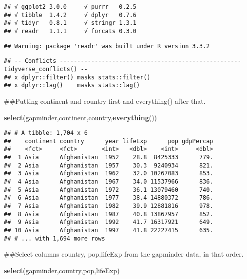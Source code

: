 \documentclass[]{article}
\newenvironment{Shaded}{\begin{snugshade}}{\end{snugshade}}
\newcommand{\KeywordTok}[1]{\textcolor[rgb]{0.13,0.29,0.53}{\textbf{#1}}}
\newcommand{\NormalTok}[1]{#1}
\begin{document}
\begin{verbatim}
## √ ggplot2 3.0.0     √ purrr   0.2.5
## √ tibble  1.4.2     √ dplyr   0.7.6
## √ tidyr   0.8.1     √ stringr 1.3.1
## √ readr   1.1.1     √ forcats 0.3.0
\end{verbatim}

\begin{verbatim}
## Warning: package 'readr' was built under R version 3.3.2
\end{verbatim}

\begin{verbatim}
## -- Conflicts ---------------------------------------------------- tidyverse_conflicts() --
## x dplyr::filter() masks stats::filter()
## x dplyr::lag()    masks stats::lag()
\end{verbatim}

\begin{Shaded}
\begin{Highlighting}[]
\NormalTok{##Putting continent and country first and everything() after that.}

\KeywordTok{select}\NormalTok{(gapminder,continent,country,}\KeywordTok{everything}\NormalTok{())}
\end{Highlighting}
\end{Shaded}

\begin{verbatim}
## # A tibble: 1,704 x 6
##    continent country      year lifeExp      pop gdpPercap
##    <fct>     <fct>       <int>   <dbl>    <int>     <dbl>
##  1 Asia      Afghanistan  1952    28.8  8425333      779.
##  2 Asia      Afghanistan  1957    30.3  9240934      821.
##  3 Asia      Afghanistan  1962    32.0 10267083      853.
##  4 Asia      Afghanistan  1967    34.0 11537966      836.
##  5 Asia      Afghanistan  1972    36.1 13079460      740.
##  6 Asia      Afghanistan  1977    38.4 14880372      786.
##  7 Asia      Afghanistan  1982    39.9 12881816      978.
##  8 Asia      Afghanistan  1987    40.8 13867957      852.
##  9 Asia      Afghanistan  1992    41.7 16317921      649.
## 10 Asia      Afghanistan  1997    41.8 22227415      635.
## # ... with 1,694 more rows
\end{verbatim}

\begin{Shaded}
\begin{Highlighting}[]
\NormalTok{##Select columns country, pop,lifeExp from the gapminder data, in that order.}

\KeywordTok{select}\NormalTok{(gapminder,country,pop,lifeExp)}
\end{Highlighting}
\end{Shaded}
\end{document}
